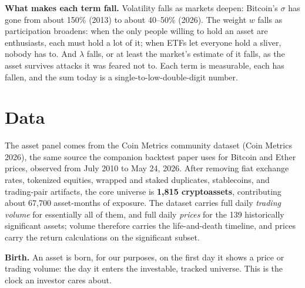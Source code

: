 \documentclass[11pt]{article}
\begin{document}
\textbf{What makes each term fall.} Volatility falls as markets deepen: Bitcoin's $\sigma$ has gone from about 150\% (2013) to about 40--50\% (2026). The weight $w$ falls as participation broadens: when the only people willing to hold an asset are enthusiasts, each must hold a lot of it; when ETFs let everyone hold a sliver, nobody has to. And $\lambda$ falls, or at least the market's estimate of it falls, as the asset survives attacks it was feared not to. Each term is measurable, each has fallen, and the sum today is a single-to-low-double-digit number.

\section{Data}

The asset panel comes from the Coin Metrics community dataset (Coin Metrics 2026), the same source the companion backtest paper uses for Bitcoin and Ether prices, observed from July 2010 to May 24, 2026. After removing fiat exchange rates, tokenized equities, wrapped and staked duplicates, stablecoins, and trading-pair artifacts, the core universe is \textbf{1,815 cryptoassets}, contributing about 67,700 asset-months of exposure. The dataset carries full daily \emph{trading volume} for essentially all of them, and full daily \emph{prices} for the 139 historically significant assets; volume therefore carries the life-and-death timeline, and prices carry the return calculations on the significant subset.

\textbf{Birth.} An asset is born, for our purposes, on the first day it shows a price or trading volume: the day it enters the investable, tracked universe. This is the clock an investor cares about.
\end{document}
